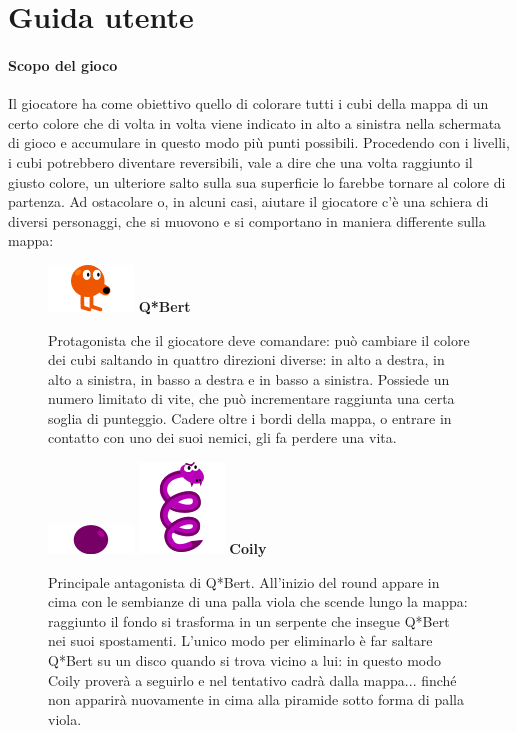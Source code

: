 \documentclass[a4paper,12pt, hidelinks]{report}
\begin{document}
\appendix
\chapter{Guida utente}

\subsubsection{Scopo del gioco}

Il giocatore ha come obiettivo quello di colorare tutti i cubi della mappa di un certo colore che di volta in volta viene indicato in alto a sinistra nella schermata di gioco e accumulare in questo modo più punti possibili. Procedendo con i livelli, i cubi potrebbero diventare reversibili, vale a dire che una volta raggiunto il giusto colore, un ulteriore salto sulla sua superficie lo farebbe tornare al colore di partenza. Ad ostacolare o, in alcuni casi, aiutare il giocatore c'è una schiera di diversi personaggi, che si muovono e si comportano in maniera differente sulla mappa:


\begin{figure}[H]
		\item
		\includegraphics[width=0.15\linewidth]{img/Qbert}
		\label{img:Q*Bert}
		\textbf{Q*Bert}

		Protagonista che il giocatore deve comandare: può cambiare il colore dei cubi saltando in quattro direzioni diverse: in alto a destra, in alto a sinistra, in basso a destra e in basso a sinistra. Possiede un numero limitato di vite, che può incrementare raggiunta una certa soglia di punteggio. Cadere oltre i bordi della mappa, o entrare in contatto con uno dei suoi nemici, gli fa perdere una vita.

\end{figure}

\begin{figure}[H]
		\item
		\includegraphics[width=0.15\linewidth]{img/PurpleBall}
		\includegraphics[width=0.15\linewidth]{img/Coily}
		\label{img:Coily}
		\textbf{Coily}

		Principale antagonista di Q*Bert. All'inizio del round appare in cima con le sembianze di una palla viola che scende lungo la mappa: raggiunto il fondo si trasforma in un serpente che insegue Q*Bert nei suoi spostamenti. L'unico modo per eliminarlo è far saltare Q*Bert su un disco quando si trova vicino a lui: in questo modo Coily proverà a seguirlo e nel tentativo cadrà dalla mappa... finché non apparirà nuovamente in cima alla piramide sotto forma di palla viola.

\end{figure}
\end{document}
